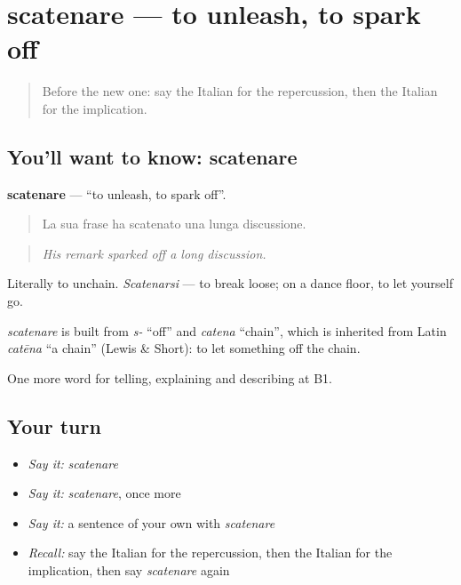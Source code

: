 \section[scatenare]{scatenare — to unleash, to spark off}

\label{lesson:IT-C352-scatenare}



\begin{quote}
Before the new one: say the Italian for the repercussion, then the Italian for the implication.
\end{quote}

\subsection*{You'll want to know: scatenare}
\textbf{scatenare} — \textquotedblleft{}to unleash, to spark off\textquotedblright{}.

\begin{quote}
La sua frase ha scatenato una lunga discussione.
\end{quote}

\begin{quote}
\emph{His remark sparked off a long discussion.}
\end{quote}

Literally to unchain. \emph{Scatenarsi} — to break loose; on a dance floor, to let yourself go.

\begin{cousinweb}
\emph{scatenare} is built from \emph{s-} \textquotedblleft{}off\textquotedblright{} and \emph{catena} \textquotedblleft{}chain\textquotedblright{}, which is inherited from Latin \emph{catēna} \textquotedblleft{}a chain\textquotedblright{} (Lewis \& Short): to let something off the chain.
\end{cousinweb}

\begin{grammarlens}[title={What you've built}]
One more word for telling, explaining and describing at B1.
\end{grammarlens}

\subsection*{Your turn}
\begin{itemize}
\raggedright
  \item \emph{Say it:} \emph{scatenare}
  \item \emph{Say it:} \emph{scatenare}, once more
  \item \emph{Say it:} a sentence of your own with \emph{scatenare}
  \item \emph{Recall:} say the Italian for the repercussion, then the Italian for the implication, then say \emph{scatenare} again
\end{itemize}


